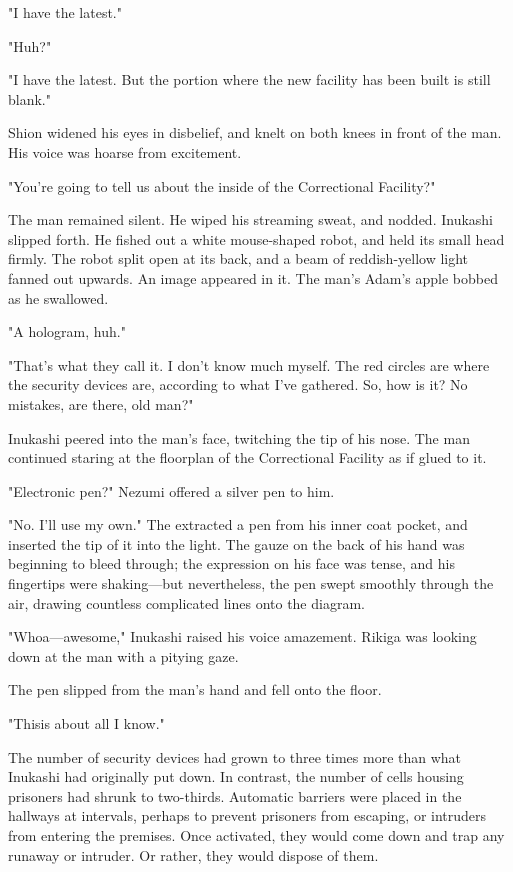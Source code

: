 "I have the latest."

"Huh?"

"I have the latest. But the portion where the new facility has been
built is still blank."

Shion widened his eyes in disbelief, and knelt on both knees in front of
the man. His voice was hoarse from excitement.

"You're going to tell us about the inside of the Correctional Facility?"

The man remained silent. He wiped his streaming sweat, and nodded.
Inukashi slipped forth. He fished out a white mouse-shaped robot, and
held its small head firmly. The robot split open at its back, and a beam
of reddish-yellow light fanned out upwards. An image appeared in it. The
man's Adam's apple bobbed as he swallowed.

"A hologram, huh."

"That's what they call it. I don't know much myself. The red circles are
where the security devices are, according to what I've gathered. So, how
is it? No mistakes, are there, old man?"

Inukashi peered into the man's face, twitching the tip of his nose. The
man continued staring at the floorplan of the Correctional Facility as
if glued to it.

"Electronic pen?" Nezumi offered a silver pen to him.

"No. I'll use my own." The extracted a pen from his inner coat pocket,
and inserted the tip of it into the light. The gauze on the back of his
hand was beginning to bleed through; the expression on his face was
tense, and his fingertips were shaking---but nevertheless, the pen swept
smoothly through the air, drawing countless complicated lines onto the
diagram.

"Whoa---awesome," Inukashi raised his voice amazement. Rikiga was looking
down at the man with a pitying gaze.

The pen slipped from the man's hand and fell onto the floor.

"This\el is about all I know."

The number of security devices had grown to three times more than what
Inukashi had originally put down. In contrast, the number of cells
housing prisoners had shrunk to two-thirds. Automatic barriers were
placed in the hallways at intervals, perhaps to prevent prisoners from
escaping, or intruders from entering the premises. Once activated, they
would come down and trap any runaway or intruder. Or rather, they would
dispose of them.

